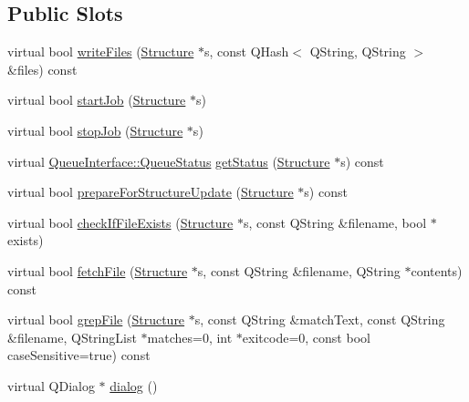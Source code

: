 \subsection*{Public Slots}
\begin{DoxyCompactItemize}
\item 
virtual bool \hyperlink{classGlobalSearch_1_1LocalQueueInterface_a68b017d4ee519055fc22dcb486ec2d45}{write\-Files} (\hyperlink{classGlobalSearch_1_1Structure}{Structure} $\ast$s, const Q\-Hash$<$ Q\-String, Q\-String $>$ \&files) const 
\item 
virtual bool \hyperlink{classGlobalSearch_1_1LocalQueueInterface_a5dae655b3316d9443ca5865a65b8d9f4}{start\-Job} (\hyperlink{classGlobalSearch_1_1Structure}{Structure} $\ast$s)
\item 
virtual bool \hyperlink{classGlobalSearch_1_1LocalQueueInterface_abd9adf1468347b0bdcc4f1f8c3676c1a}{stop\-Job} (\hyperlink{classGlobalSearch_1_1Structure}{Structure} $\ast$s)
\item 
virtual \hyperlink{classGlobalSearch_1_1QueueInterface_a08dcf06d1b99f6333472470490ca9a6d}{Queue\-Interface\-::\-Queue\-Status} \hyperlink{classGlobalSearch_1_1LocalQueueInterface_a1a6177bcf15d3df5dd744ca096cab86d}{get\-Status} (\hyperlink{classGlobalSearch_1_1Structure}{Structure} $\ast$s) const 
\item 
virtual bool \hyperlink{classGlobalSearch_1_1LocalQueueInterface_aec8ffad280b7e550d90529624c3b50fe}{prepare\-For\-Structure\-Update} (\hyperlink{classGlobalSearch_1_1Structure}{Structure} $\ast$s) const 
\item 
virtual bool \hyperlink{classGlobalSearch_1_1LocalQueueInterface_a7dfd8f70a313746a2651b405651d5c6c}{check\-If\-File\-Exists} (\hyperlink{classGlobalSearch_1_1Structure}{Structure} $\ast$s, const Q\-String \&filename, bool $\ast$exists)
\item 
virtual bool \hyperlink{classGlobalSearch_1_1LocalQueueInterface_ae0b1b95c62405c79b41604b7a4794a0d}{fetch\-File} (\hyperlink{classGlobalSearch_1_1Structure}{Structure} $\ast$s, const Q\-String \&filename, Q\-String $\ast$contents) const 
\item 
virtual bool \hyperlink{classGlobalSearch_1_1LocalQueueInterface_a948f5d6109f3fd3dff74799bb7573363}{grep\-File} (\hyperlink{classGlobalSearch_1_1Structure}{Structure} $\ast$s, const Q\-String \&match\-Text, const Q\-String \&filename, Q\-String\-List $\ast$matches=0, int $\ast$exitcode=0, const bool case\-Sensitive=true) const 
\item 
virtual Q\-Dialog $\ast$ \hyperlink{group__dialog_ga4bd87bf2050209a72d1a35c824e515da}{dialog} ()
\end{DoxyCompactItemize}
